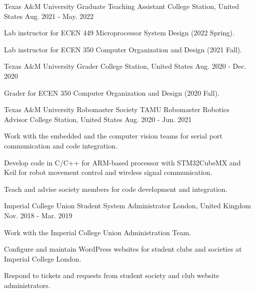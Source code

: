 
\begin{cventries}
  \cventry
    {Texas A\&M University} %
    {Graduate Teaching Assistant} %
    {College Station, United States} %
    {Aug. 2021 - May. 2022} %
    {
      \begin{cvitems} %
        \item {Lab instructor for ECEN 449 Microprocessor System Design (2022 Spring).}
        \item {Lab instructor for ECEN 350 Computer Organization and Design (2021 Fall).}
      \end{cvitems}
    }
    
  \cventry
    {Texas A\&M University} %
    {Grader} %
    {College Station, United States} %
    {Aug. 2020 - Dec. 2020} %
    {
      \begin{cvitems} %
        \item {Grader for ECEN 350 Computer Organization and Design (2020 Fall).}
      \end{cvitems}
    }
    
  \cventry
    {Texas A\&M University Robomaster Society} %
    {TAMU Robomaster Robotics Advisor} %
    {College Station, United States} %
    {Aug. 2020 - Jun. 2021} %
    {
      \begin{cvitems} %
        \item {Work with the embedded and the computer vision teams for serial port communication and code integration.}
        \item {Develop code in C/C++ for ARM-based processor with STM32CubeMX and Keil for robot movement control and wireless signal communication.}
        \item {Teach and advise society members for code development and integration.}
      \end{cvitems}
    }

  \cventry
    {Imperial College Union} %
    {Student System Administrator} %
    {London, United Kingdom} %
    {Nov. 2018 - Mar. 2019} %
    {
      \begin{cvitems} %
        \item {Work with the Imperial College Union Administration Team.}
        \item {Configure and maintain WordPress websites for student clubs and societies at Imperial College London.}
        \item {Respond to tickets and requests from student society and club website administrators.}
      \end{cvitems}
    }


\end{cventries}
